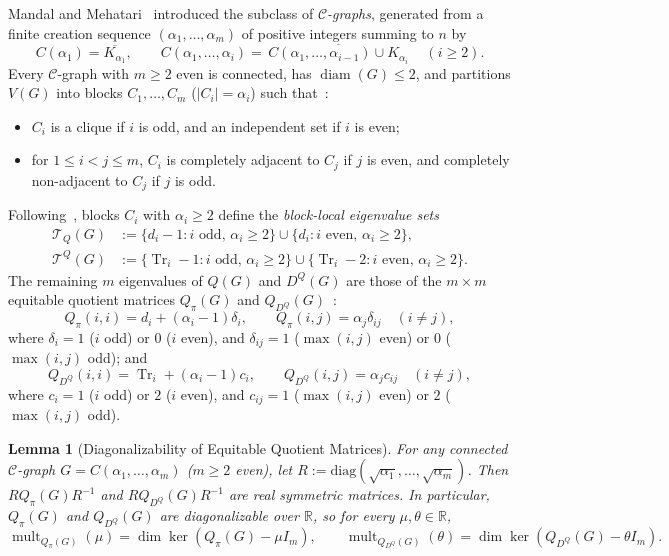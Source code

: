 \documentclass[11pt,a4paper]{article}
\newtheorem{lemma}[theorem]{Lemma}
\theoremstyle{definition}
\DeclareMathOperator{\Tr}{Tr}
\DeclareMathOperator{\mult}{mult}
\DeclareMathOperator{\diam}{diam}
\begin{document}
Mandal and Mehatari~\cite{MM2025} introduced the subclass of \emph{$\mathcal{C}$-graphs}, generated from a finite creation sequence $(\alpha_1, \dots, \alpha_m)$ of positive integers summing to $n$ by
\[
  C(\alpha_1) = \overline{K_{\alpha_1}}, \qquad
  C(\alpha_1,\dots,\alpha_i) = \overline{\,C(\alpha_1,\dots,\alpha_{i-1}) \cup K_{\alpha_i}\,} \quad (i \ge 2).
\]
Every $\mathcal{C}$-graph with $m \ge 2$ even is connected, has $\diam(G) \le 2$, and partitions $V(G)$ into blocks $C_1,\dots,C_m$ ($|C_i| = \alpha_i$) such that~\cite[Proposition~4.2]{MM2026}:
\begin{itemize}
  \item $C_i$ is a clique if $i$ is odd, and an independent set if $i$ is even;
  \item for $1 \le i < j \le m$, $C_i$ is completely adjacent to $C_j$ if $j$ is even, and completely non-adjacent to $C_j$ if $j$ is odd.
\end{itemize}
Following~\cite{MM2026}, blocks $C_i$ with $\alpha_i \ge 2$ define the \emph{block-local eigenvalue sets}
\begin{align*}
  \mathcal{T}_Q(G) &:= \{d_i - 1 : i\text{ odd},\, \alpha_i \ge 2\} \cup \{d_i : i\text{ even},\, \alpha_i \ge 2\}, \\
  \mathcal{T}^Q(G) &:= \{\Tr_i - 1 : i\text{ odd},\, \alpha_i \ge 2\} \cup \{\Tr_i - 2 : i\text{ even},\, \alpha_i \ge 2\}.
\end{align*}
The remaining $m$ eigenvalues of $Q(G)$ and $D^Q(G)$ are those of the $m \times m$ equitable quotient matrices $Q_\pi(G)$ and $Q_{D^Q}(G)$~\cite[Theorem~4.3]{MM2026}:
\begin{equation}\label{eq:Qpi}
  Q_\pi(i,i) = d_i + (\alpha_i - 1)\delta_i, \qquad
  Q_\pi(i,j) = \alpha_j \delta_{ij} \quad (i \ne j),
\end{equation}
where $\delta_i = 1$ ($i$ odd) or $0$ ($i$ even), and $\delta_{ij} = 1$ ($\max(i,j)$ even) or $0$ ($\max(i,j)$ odd); and
\begin{equation}\label{eq:QDQ}
  Q_{D^Q}(i,i) = \Tr_i + (\alpha_i - 1) c_i, \qquad
  Q_{D^Q}(i,j) = \alpha_j c_{ij} \quad (i \ne j),
\end{equation}
where $c_i = 1$ ($i$ odd) or $2$ ($i$ even), and $c_{ij} = 1$ ($\max(i,j)$ even) or $2$ ($\max(i,j)$ odd).

\begin{lemma}[Diagonalizability of Equitable Quotient Matrices]\label{lem:diag}
  For any connected $\mathcal{C}$-graph $G = C(\alpha_1,\dots,\alpha_m)$ ($m \ge 2$ even), let $R := \mathrm{diag}(\sqrt{\alpha_1},\dots,\sqrt{\alpha_m})$. Then $R Q_\pi(G) R^{-1}$ and $R Q_{D^Q}(G) R^{-1}$ are real symmetric matrices. In particular, $Q_\pi(G)$ and $Q_{D^Q}(G)$ are diagonalizable over $\mathbb{R}$, so for every $\mu, \theta \in \mathbb{R}$,
  \[
    \mult_{Q_\pi(G)}(\mu) = \dim\ker(Q_\pi(G) - \mu I_m), \qquad
    \mult_{Q_{D^Q}(G)}(\theta) = \dim\ker(Q_{D^Q}(G) - \theta I_m).
  \]
\end{lemma}
\end{document}
